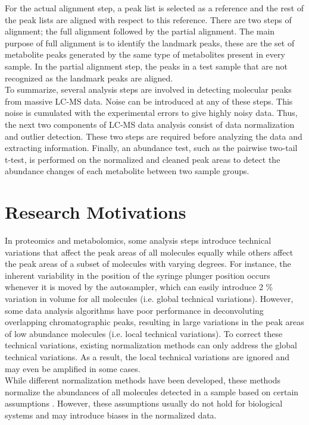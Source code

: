 For the actual alignment step, a peak list is selected as a reference and the rest of the
peak lists are aligned with respect to this reference. There are two steps of alignment; the full alignment followed by the partial alignment. The main purpose of full alignment is to identify
the landmark peaks, these are the set of metabolite peaks
generated by the same type of metabolites present in
every sample. In the partial alignment step, the peaks in a test sample
that are not recognized as the landmark peaks are aligned.\\
\indent To summarize, several analysis steps are involved in detecting molecular peaks from massive LC-MS data. Noise can be introduced at any of these steps. This noise is cumulated with the experimental errors to give highly noisy data. Thus, the next two components of LC-MS data analysis consist of data normalization and outlier detection. These two steps are required before analyzing the data and extracting information. 
Finally, an abundance test, such as the pairwise two-tail t-test, is performed on the normalized and cleaned peak areas to detect
the abundance changes of each metabolite between two sample
groups.

\section{Research Motivations} 
In proteomics and metabolomics, some analysis steps introduce technical variations that affect the peak areas of all molecules equally while others affect the peak areas of a subset of molecules with varying degrees. For instance, the inherent variability in the position of the syringe plunger position occurs whenever it is moved by the autosampler, which can easily introduce 2 \% variation in volume for all molecules (i.e. global technical variations). However, some data analysis algorithms have poor performance in deconvoluting overlapping chromatographic peaks, resulting in large variations in the peak areas of low abundance molecules (i.e. local technical variations). To correct these technical variations, existing normalization methods can only address the global technical variations. As a result, the local technical variations are ignored and may even be amplified in some cases.\\
While different normalization methods have been developed, these methods normalize the
abundances of all molecules detected in a sample based on certain assumptions \cite{clevland}\cite{astrand:eke}. However, these assumptions  usually do not hold for biological systems and may introduce biases in the normalized data.\\



